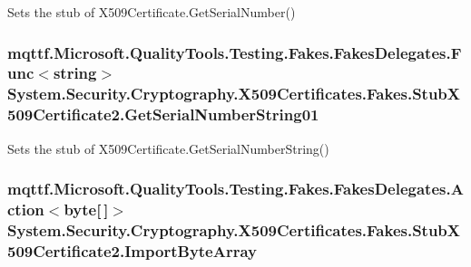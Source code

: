 Sets the stub of X509\-Certificate.\-Get\-Serial\-Number()

\hypertarget{class_system_1_1_security_1_1_cryptography_1_1_x509_certificates_1_1_fakes_1_1_stub_x509_certificate2_a8bac29a1fc074d77a200eaaa0f6e48ef}{
\subsubsection[{Get\-Serial\-Number\-String01}]{\setlength{\rightskip}{0pt plus 5cm}mqttf.\-Microsoft.\-Quality\-Tools.\-Testing.\-Fakes.\-Fakes\-Delegates.\-Func$<$string$>$ System.\-Security.\-Cryptography.\-X509\-Certificates.\-Fakes.\-Stub\-X509\-Certificate2.\-Get\-Serial\-Number\-String01}}\label{class_system_1_1_security_1_1_cryptography_1_1_x509_certificates_1_1_fakes_1_1_stub_x509_certificate2_a8bac29a1fc074d77a200eaaa0f6e48ef}


Sets the stub of X509\-Certificate.\-Get\-Serial\-Number\-String()

\hypertarget{class_system_1_1_security_1_1_cryptography_1_1_x509_certificates_1_1_fakes_1_1_stub_x509_certificate2_aa668baec3855ff4e00ba9b6307f3553d}{
\subsubsection[{Import\-Byte\-Array}]{\setlength{\rightskip}{0pt plus 5cm}mqttf.\-Microsoft.\-Quality\-Tools.\-Testing.\-Fakes.\-Fakes\-Delegates.\-Action$<$byte\mbox{[}$\,$\mbox{]}$>$ System.\-Security.\-Cryptography.\-X509\-Certificates.\-Fakes.\-Stub\-X509\-Certificate2.\-Import\-Byte\-Array}}\label{class_system_1_1_security_1_1_cryptography_1_1_x509_certificates_1_1_fakes_1_1_stub_x509_certificate2_aa668baec3855ff4e00ba9b6307f3553d}


